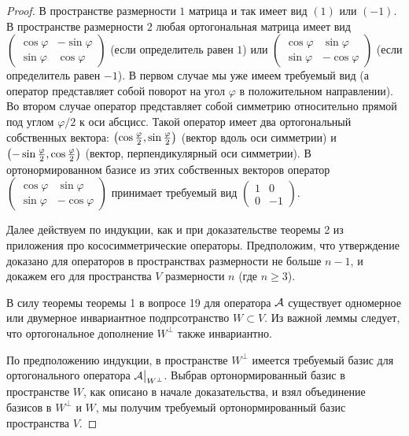 \begin{proof}
    В пространстве размерности $1$ матрица и так имеет вид $(1)$ или $(-1)$. В пространстве размерности $2$ любая ортогональная матрица имеет вид
    $
    \begin{pmatrix}
        \cos\varphi & -\sin\varphi\\
        \sin\varphi & \cos\varphi
    \end{pmatrix}
    $ (если определитель равен $1$) или
    $
    \begin{pmatrix}
        \cos\varphi & \sin\varphi\\
        \sin\varphi & -\cos\varphi
    \end{pmatrix}
    $ (если определитель равен $-1$). В первом случае мы уже имеем требуемый вид (а оператор представляет собой поворот на угол $\varphi$ в положительном направлении). Во втором случае оператор представляет собой симметрию относительно прямой под углом $\varphi / 2$ к оси абсцисс. Такой оператор имеет два ортогональный собственных вектора: $\left(\cos\frac{\varphi}{2}, \sin\frac{\varphi}{2}\right)$ (вектор вдоль оси симметрии) и $\left(-\sin\frac{\varphi}{2}, \cos\frac{\varphi}{2}\right)$ (вектор, перпендикулярный оси симметрии). В ортонормированном базисе из этих собственных векторов оператор
    $
    \begin{pmatrix}
        \cos\varphi & \sin\varphi\\
        \sin\varphi & -\cos\varphi
    \end{pmatrix}
    $ принимает требуемый вид
    $
    \begin{pmatrix}
        1 & 0\\
        0 & -1
    \end{pmatrix}
    $.

    Далее действуем по индукции, как и при доказательстве теоремы 2 из приложения про кососимметрические операторы. Предположим, что утверждение доказано для операторов в пространствах размерности не больше $n - 1$, и докажем его для пространства $V$ размерности $n$ (где $n \geqslant 3$).

    В силу теоремы теоремы 1 в вопросе 19 для оператора $\mathcal{A}$ существует одномерное или двумерное инвариантное подпрсотранство $W \subset V$. Из важной леммы следует, что ортогональное дополнение $W^\perp$ также инвариантно.

    По предположению индукции, в пространстве $W^\perp$ имеется требуемый базис для ортогонального оператора $\mathcal{A}\big|_{W^\perp}$. Выбрав ортонормированный базис в пространстве $W$, как описано в начале доказательства, и взял объединение базисов в $W^\perp$ и $W$, мы получим требуемый ортонормированный базис пространства $V$.
\end{proof}

